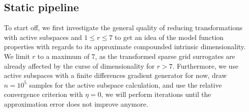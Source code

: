 \documentclass[
  a4paper,  %
  twoside,  %
  bibliography=totoc,
  headsepline,
  cleardoublepage=empty,
  parskip=half,
  draft=false
]{scrbook}
\begin{document}
\subsection{Static pipeline}

To start off, we first investigate the general quality of reducing transformations with active subspaces and $1 \leq r \leq 7$ to get an idea of the model function properties with regards to its approximate compounded intrinsic dimensionality.
We limit $r$ to a maximum of $7$, as the transformed sparse grid surrogates are already affected by the curse of dimensionality for $r > 7$.
Furthermore, we use active subspaces with a finite differences gradient generator for now, draw $n=10^5$ samples for the active subspace calculation, and use the relative convergence criterion with $\eta=0$, \ie we will perform iterations until the approximation error does not improve anymore.
\end{document}
